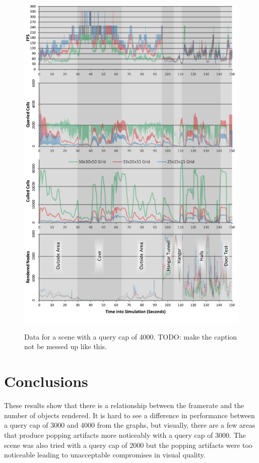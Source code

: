 \documentclass[12pt]{ucthesis}
\newcommand{\captionfonts}{\small\bf\ssp}
\begin{document}
\begin{figure}
\begin{center}
\includegraphics[width=\textwidth]{Images/Graphs/480-50x30x50-2000-10-1-1-1.pdf}
\label{fig:graph-4000}
\captionfonts
\caption[Query Cap of 4000]{Data for a scene with a query cap of 4000.  TODO: make the caption not be messed up like this.}
\end{center}
\end{figure}

\section{Conclusions}
\label{conclusions}
These results show that there is a relationship between the framerate and the number of objects rendered.
It is hard to see a difference in performance between a query cap of 3000 and 4000 from the graphs, but visually, there are a few areas that produce popping artifacts more noticeably with a query cap of 3000.
The scene was also tried with a query cap of 2000 but the popping artifacts were too noticeable leading to unacceptable compromises in visual quality.
\end{document}
